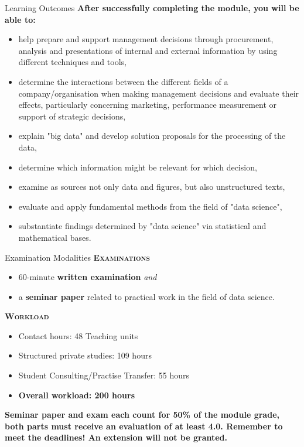 \documentclass[document.tex]{subfiles}
\begin{document}
    
    \begin{frame}{Learning Outcomes}
        \textbf{After successfully completing the module, you will be able to:}
        \begin{itemize}
            \item help prepare and support management decisions through procurement, analysis and presentations of internal and external information by using different techniques and tools,
            \item determine the interactions between the different fields of a company/organisation when making management decisions and evaluate their effects, particularly concerning marketing, performance measurement or support of strategic decisions,
            \item explain "big data" and develop solution proposals for the processing of the data,
            \item determine which information might be relevant for which decision,
            \item examine as sources not only data and figures, but also unstructured texts,
            \item evaluate and apply fundamental methods from the field of "data science",
            \item substantiate findings determined by "data science" via statistical and mathematical bases.
        \end{itemize}
    \end{frame}

    \begin{frame}{Examination Modalities}
        \alert{\textbf{\textsc{Examinations}}}
        \vspace{-1mm}
        \begin{itemize}
            \item 60-minute \textbf{written examination} \textit{and}
            \item a \textbf{seminar paper} related to practical work in the field of data science.
        \end{itemize}

        \alert{\textbf{\textsc{Workload}}}
        \vspace{-1mm}
        \begin{itemize}
            \item Contact hours: 48 Teaching units
            \item Structured private studies: 109 hours
            \item Student Consulting/Practise Transfer: 55 hours
            \item \textbf{Overall workload: 200 hours}
        \end{itemize}
        	
        \textbf{Seminar paper and exam each count for 50\% of the module grade, both parts must receive an evaluation of at least 4.0. Remember to meet the deadlines! An extension will not be granted.}
    \end{frame}
\end{document}
